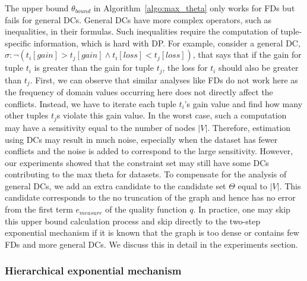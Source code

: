 The upper bound $\theta_{bound}$ in Algorithm~\ref{algo:max_theta} only works for FDs but fails for general DCs. General DCs have more complex operators, such as inequalities, in their formulas. Such inequalities require the computation of tuple-specific information, which is hard with DP. For example, consider a general DC, $\sigma: \neg(t_i[gain] > t_j[gain] \land t_i[loss] < t_j[loss])$, that says that if the gain for tuple $t_i$ is greater than the gain for tuple $t_j$, the loss for $t_i$ should also be greater than $t_j$. First, we can observe that similar analyses like FDs do not work here as the frequency of domain values occurring here does not directly affect the conflicts. Instead, we have to iterate each tuple $t_i$'s gain value and find how many other tuples $t_j$s violate this gain value. In the worst case, such a computation may have a sensitivity equal to the number of nodes $|V|$. Therefore, estimation using DCs may result in much noise, especially when the dataset has fewer conflicts and the noise is added to correspond to the large sensitivity. However, our experiments showed that the constraint set may still have some DCs contributing to the max theta for datasets. To compensate for the analysis of general DCs, we add an extra candidate to the candidate set $\Theta$ equal to $|V|$. This candidate corresponds to the no truncation of the graph and hence has no error from the first term $e_{measure}$ of the quality function $q$. In practice, one may skip this upper bound calculation process and skip directly to the two-step exponential mechanism if it is known that the graph is too dense or contains few FDs and more general DCs. We discuss this in detail in the experiments section. 


\subsubsection{Hierarchical exponential mechanism}\label{sec:dc_aware_hier_expo_mech}

